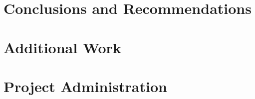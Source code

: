 \documentclass{article}
\begin{document}
\section{Conclusions and Recommendations}


\newpage



\appendix

\newpage

\section{Additional Work}


\newpage

\section{Project Administration}

\end{document}
